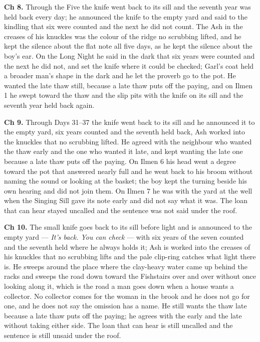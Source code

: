 \documentclass{design/chronicle}
\begin{document}
{\textbf{Ch 8.} Through the Five the knife went back to its sill and the seventh year was held back every day; he announced the knife to the empty yard and said to the kindling that six were counted and the next he did not count. The Ash in the creases of his knuckles was the colour of the ridge no scrubbing lifted, and he kept the silence about the flat note all five days, as he kept the silence about the boy’s ear. On the Long Night he said in the dark that six years were counted and the next he did not, and set the knife where it could be checked; Garl’s coat held a broader man’s shape in the dark and he let the proverb go to the pot. He wanted the late thaw still, because a late thaw puts off the paying, and on Ilmen 1 he swept toward the thaw and the slip pits with the knife on its sill and the seventh year held back again.

\textbf{Ch 9.} Through Days 31–37 the knife went back to its sill and he announced it to the empty yard, six years counted and the seventh held back, Ash worked into the knuckles that no scrubbing lifted. He agreed with the neighbour who wanted the thaw early and the one who wanted it late, and kept wanting the late one because a late thaw puts off the paying. On Ilmen 6 his head went a degree toward the pot that answered nearly full and he went back to his broom without naming the sound or looking at the basket; the boy kept the turning beside his own hearing and did not join them. On Ilmen 7 he was with the yard at the well when the Singing Sill gave its note early and did not say what it was. The loan that can hear stayed uncalled and the sentence was not said under the roof.

\textbf{Ch 10.} The small knife goes back to its sill before light and is announced to the empty yard --- \emph{It’s back. You can check} --- with six years of the seven counted and the seventh held where he always holds it; Ash is worked into the creases of his knuckles that no scrubbing lifts and the pale clip-ring catches what light there is. He sweeps around the place where the clay-heavy water came up behind the racks and sweeps the road down toward the Fishstairs over and over without once looking along it, which is the road a man goes down when a house wants a collector. No collector comes for the woman in the brook and he does not go for one, and he does not say the omission has a name. He still wants the thaw late because a late thaw puts off the paying; he agrees with the early and the late without taking either side. The loan that can hear is still uncalled and the sentence is still unsaid under the roof.

}
\end{document}
